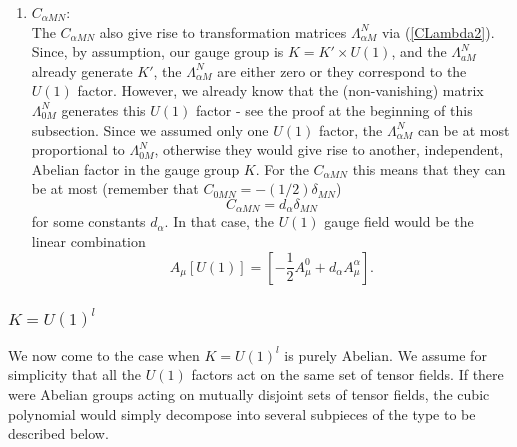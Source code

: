 \documentclass[a4paper,11pt]{article}
\begin{document}
\begin{enumerate}
\item  $C_{\alpha MN}$:\\
The $C_{\alpha MN}$ also give rise to transformation matrices
$\Lambda_{\alpha M}^{N}$ via (\ref{CLambda2}). Since, by
assumption, our gauge group is $K=K'\times U(1)$, and the $\Lambda_{aM}^{N}$
already generate $K'$, the $\Lambda_{\alpha M}^{N}$ are either
zero or they correspond to the $U(1)$ factor. However, we already know
that the (non-vanishing) matrix
$\Lambda_{0M}^{N}$ generates this $U(1)$ factor - see the proof at
the beginning of this subsection. Since we assumed only one
$U(1)$ factor, the $\Lambda_{\alpha M}^{N}$ can be at most
proportional to $\Lambda_{0M}^{N}$, otherwise they would give rise
to another, independent, Abelian factor in the gauge group $K$.
For the $C_{\alpha MN}$ this means that they can be at most
(remember that $C_{0MN}=-(1/2)\delta_{MN}$)
\begin{displaymath}
    C_{\alpha MN}=d_{\alpha}\delta_{MN}
\end{displaymath}
for some constants $d_{\alpha}$. In that case, the $U(1)$ gauge
field would be the linear combination
\begin{displaymath}
A_{\mu}[U(1)]=\left[-\frac{1}{2}A_{\mu}^{0}+d_{\alpha}
        A_{\mu}^{\alpha}\right].
\end{displaymath}


\end{enumerate}

\subsubsection{$K=U(1)^l$}

We now come to the case when $K=U(1)^{l}$ is purely Abelian.  We assume
for simplicity that all the $U(1)$ factors act on the same set of tensor
fields. If there were Abelian groups acting on mutually disjoint sets of
tensor fields, the cubic polynomial would simply decompose into several
subpieces of the type to be described below. 
\end{document}
